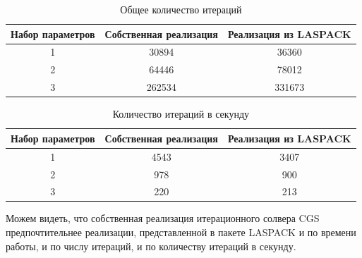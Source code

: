 \documentclass[specialist,subf,href,colorlinks=true,12pt
,times,mtpro,specialist
]{disser}
\begin{document}
\begin{table}[H]
\caption{Общее количество итераций}
\begin{center}
\begin{tabular}{|c|c|c|}
\hline
Набор параметров & Собственная реализация & Реализация из LASPACK \\
\hline
1 & 30894 & 36360 \\
\hline
2 & 64446 & 78012 \\
\hline
3 & 262534 & 331673\\
\hline
\end{tabular}
\end{center}
\end{table}

\begin{table}[H]
\caption{Количество итераций в секунду}
\begin{center}
\begin{tabular}{|c|c|c|}
\hline
Набор параметров & Собственная реализация & Реализация из LASPACK \\
\hline
1 & 4543 & 3407 \\
\hline
2 & 978 & 900   \\
\hline
3 & 220 & 213 \\
\hline
\end{tabular}
\end{center}
\end{table}

Можем видеть, что собственная реализация итерационного солвера CGS предпочтительнее реализации, представленной в пакете LASPACK и по времени работы, и по числу итераций, и по количеству итераций в секунду.
\end{document}
